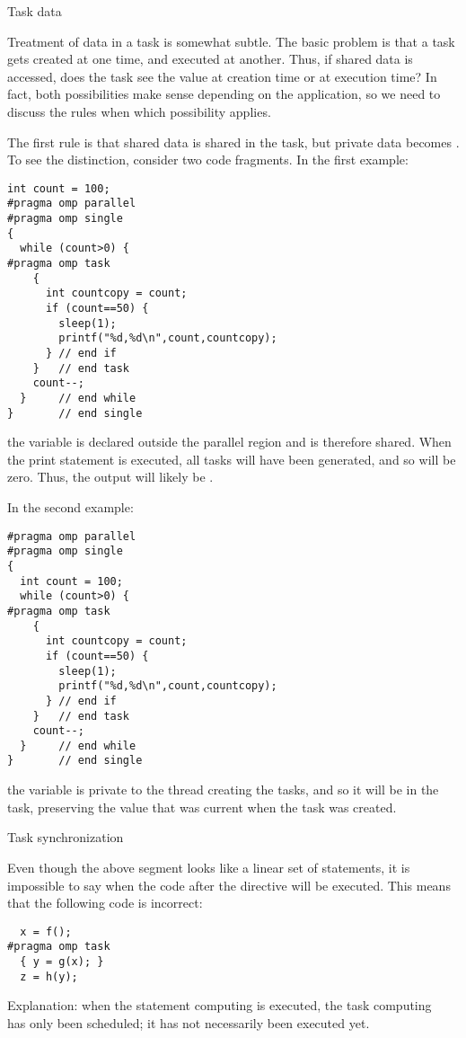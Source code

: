  {Task data}

Treatment of data in a task is somewhat subtle. The basic problem is
that a task gets created at one time, and executed at another. Thus,
if shared data is accessed, does the task see the value at creation
time or at execution time? In fact, both possibilities make sense
depending on the application, so we need to discuss the rules when
which possibility applies.

The first rule is that shared data is shared in the task, but private
data becomes . To see the distinction, consider two
code fragments. In the first example:
\begin{lstlisting}
int count = 100;
#pragma omp parallel
#pragma omp single
{
  while (count>0) {
#pragma omp task
    {
      int countcopy = count;
      if (count==50) {
        sleep(1);
        printf("%d,%d\n",count,countcopy);
      } // end if
    }   // end task
    count--;
  }     // end while
}       // end single
\end{lstlisting}
the variable  is declared outside the
parallel region and is therefore shared. When the print statement is
executed, all tasks will have been generated, and so  will be
zero. Thus, the output will likely be .

In the second example:
\begin{lstlisting}
#pragma omp parallel
#pragma omp single
{
  int count = 100;
  while (count>0) {
#pragma omp task
    {
      int countcopy = count;
      if (count==50) {
        sleep(1);
        printf("%d,%d\n",count,countcopy);
      } // end if
    }   // end task
    count--;
  }     // end while
}       // end single
\end{lstlisting}
the  variable is private to the thread creating the tasks,
and so it will be  in the task, preserving the value
that was current when the task was created.


 {Task synchronization}

Even though the above segment looks like a linear set of statements,
it is impossible to say when
the code after the  directive will be executed.
This means that the following code is incorrect:
\begin{lstlisting}
  x = f();
#pragma omp task
  { y = g(x); }
  z = h(y);  
\end{lstlisting}
Explanation: when the statement computing  is executed, the task
computing~ has only been scheduled;
it has not necessarily been executed yet.

